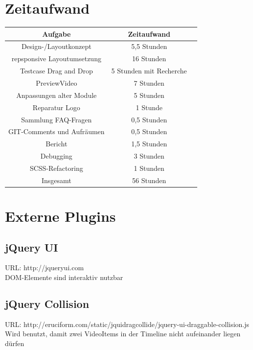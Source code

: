 \documentclass[a4paper,10pt]{scrartcl}
\begin{document}
\section{Zeitaufwand}
\begin{tabular}{|c|c|c|}\hline
	\textbf{Aufgabe} & \textbf{Zeitaufwand} \\ \hline
	
	Design-/Layoutkonzept & 5,5 Stunden \\ \hline
	
	repsponsive Layoutumsetzung & 16 Stunden \\ \hline
	
	Testcase Drag and Drop & 5 Stunden mit Recherche \\ \hline
	
	PreviewVideo & 7 Stunden \\ \hline
	
	Anpassungen alter Module & 5 Stunden \\ \hline

	Reparatur Logo & 1 Stunde \\ \hline
	
	Sammlung FAQ-Fragen & 0,5 Stunden \\ \hline
	
	GIT-Comments und Aufräumen & 0,5 Stunden \\ \hline

	Bericht & 1,5 Stunden \\ \hline

	Debugging & 3 Stunden \\ \hline
	
	SCSS-Refactoring & 1 Stunden \\ \hline

	Insgesamt & 56 Stunden \\ \hline

	
 \end{tabular}
 \newpage
\section{Externe Plugins}
\subsection{jQuery UI}
URL: http://jqueryui.com\\
DOM-Elemente sind interaktiv nutzbar
\subsection{jQuery Collision}
URL: http://eruciform.com/static/jquidragcollide/jquery-ui-draggable-collision.js\\
Wird benutzt, damit zwei VideoItems in der Timeline nicht aufeinander liegen dürfen
\end{document}
